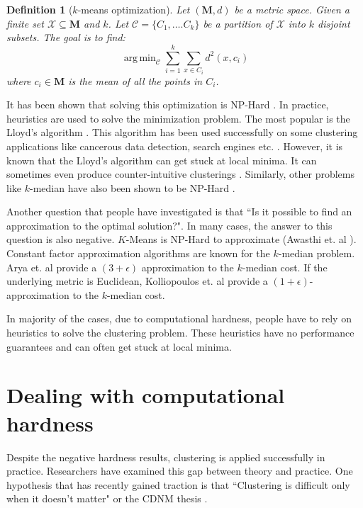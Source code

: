 \documentclass[letterpaper,12pt,titlepage,oneside,final]{book}
\DeclareMathOperator*{\argmin}{arg\,min}
\newtheorem{definition}{Definition}
\newcommand{\mc}{\mathcal}
\newcommand{\mb}{\mathbf}
\begin{document}
\begin{definition}[$k$-means optimization]
Let $(\mb M, d)$ be a metric space. Given a finite set $\mc X \subseteq \mb M$ and $k$. Let $\mc C = \{C_1, \ldots. C_k\}$ be a partition of $\mc X$ into $k$ disjoint subsets. The goal is to find:
$$\argmin_{\mc C} \sum_{i=1}^k \sum_{x \in C_i} d^2(x, c_i)$$
where $c_i \in \mb M$ is the mean of all the points in $C_i$.  
\end{definition}

It has been shown that solving this optimization is NP-Hard \cite{dasgupta2008hardness}. In practice, heuristics are used to solve the minimization problem. The most popular is the Lloyd's algorithm \cite{lloyd1982least}. This algorithm has been used successfully on some clustering applications like cancerous data detection, search engines etc. \cite{wang2005comparison,liu2007clustering}. However, it is known that the Lloyd's algorithm can get stuck at local minima. It can sometimes even produce counter-intuitive clusterings \cite{mirkes2011k}. Similarly, other problems like $k$-median have also been shown to be NP-Hard \cite{megiddo1984complexity}.  

Another question that people have investigated is that ``Is it possible to find an approximation to the optimal solution?". In many cases, the answer to this question is also negative. $K$-Means is NP-Hard to approximate (Awasthi et. al \cite{awasthi2015hardness}). Constant factor approximation algorithms are known for the $k$-median problem. Arya et. al \cite{arya2004local} provide a $(3+\epsilon)$ approximation to the $k$-median cost. If the underlying metric is Euclidean, Kolliopoulos et. al \cite{kolliopoulos1999nearly} provide a $(1+\epsilon)$-approximation to the $k$-median cost. 

In majority of the cases, due to computational hardness, people have to rely on heuristics to solve the clustering problem. These heuristics have no performance guarantees and can often get stuck at local minima. 

\section{Dealing with computational hardness}
Despite the negative hardness results, clustering is applied successfully in practice. Researchers have examined this gap between theory and practice. One hypothesis that has recently gained traction is that ``Clustering is difficult only when it doesn't matter" or the CDNM thesis \cite{daniely2012clustering}. 
\end{document}
